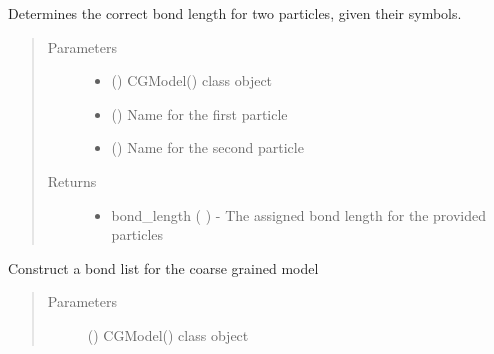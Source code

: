 \documentclass[letterpaper,12pt,english,openany,oneside]{sphinxmanual}
\begin{document}
\begin{fulllineitems}
\begin{fulllineitems}
\label{\detokenize{cg_model:cg_model.cgmodel.CGModel.get_bond_length_from_names}}
Determines the correct bond length for two particles, given their symbols.
\begin{quote}\begin{description}
\item[{Parameters}] \leavevmode\begin{itemize}
\item {} 
 () \textendash{} CGModel() class object

\item {} 
 () \textendash{} Name for the first particle

\item {} 
 () \textendash{} Name for the second particle

\end{itemize}

\item[{Returns}] \leavevmode
\begin{itemize}
\item {} 
bond\_length (  ) - The assigned bond length for the provided particles

\end{itemize}


\end{description}\end{quote}

\end{fulllineitems}


\begin{fulllineitems}
\label{\detokenize{cg_model:cg_model.cgmodel.CGModel.get_bond_list}}
Construct a bond list for the coarse grained model
\begin{quote}\begin{description}
\item[{Parameters}] \leavevmode
{} () \textendash{} CGModel() class object


\end{description}
\end{quote}
\end{fulllineitems}
\end{fulllineitems}
\end{document}
